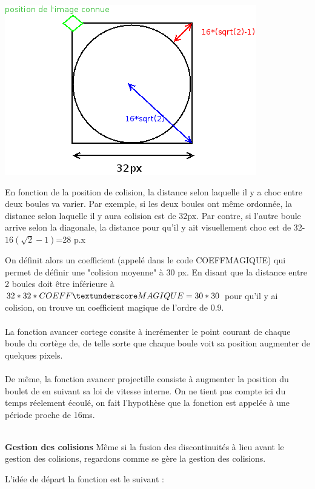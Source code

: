 \begin{center}
\includegraphics[scale=0.8]{img/boule.png}
\end{center}

En fonction de la position de colision, la distance selon laquelle il
y a choc entre deux boules va varier. Par exemple, si les deux boules
ont même ordonnée, la distance selon laquelle il y aura colision est
de 32px. Par contre, si l'autre boule arrive selon la diagonale, la
distance pour qu'il y ait visuellement choc est de
32-$16(\sqrt{2}-1)$=28 p.x

On définit alors un coefficient (appelé dans le code
COEFF\textunderscore MAGIQUE) qui permet de définir une "colision
moyenne" à 30 px. En disant que la distance entre 2 boules doit être
inférieure à $32*32*COEFF\textunderscore MAGIQUE = 30*30$ pour qu'il y ai
colision, on trouve un coefficient magique de l'ordre de 0.9.
\\
\\
La fonction avancer cortege consite à incrémenter le point courant de
chaque boule du cortège de, de telle sorte que chaque boule voit sa
position augmenter de quelques pixels.
\\
\\
De même, la fonction avancer projectille consiste à augmenter la
position du boulet de en suivant sa loi de
vitesse interne. On ne tient pas compte ici du temps réelement écoulé,
on fait l'hypothèse que la fonction est appelée à une période proche
de 16ms.

~\\
\textbf{Gestion des colisions}
Même si la fusion des discontinuités à lieu avant le gestion des
colisions, regardons comme se gère la gestion des colisions. 

L'idée de départ la fonction est le suivant :


